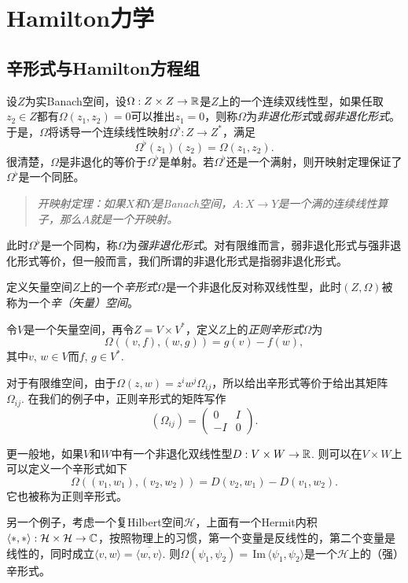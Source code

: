 \chapter{Hamilton力学}
\section{辛形式与Hamilton方程组}

\begin{para}
	设$Z$为实Banach空间，设$\Omega:Z\times Z\to \mathbb{R}$是$Z$上的一个连续双线性型，如果任取$z_2\in Z$都有$\Omega(z_1,z_2)=0$可以推出$z_1=0$，则称$\Omega$为\textit{非退化形式}或\textit{弱非退化形式}。于是，$\Omega$将诱导一个连续线性映射$\Omega^\flat:Z\to Z^*$，满足
	\[
		\Omega^\flat(z_1)(z_2)=\Omega(z_1,z_2).
	\]
	很清楚，$\Omega$是非退化的等价于$\Omega^\flat$是单射。若$\Omega^\flat$还是一个满射，则开映射定理保证了$\Omega^\flat$是一个同胚。
	\begin{quote}\it
	开映射定理：如果$X$和$Y$是Banach空间，$A : X \to Y$是一个满的连续线性算子，那么$A$就是一个开映射。
	\end{quote}
	此时$\Omega^\flat$是一个同构，称$\Omega$为\textit{强非退化形式}。对有限维而言，弱非退化形式与强非退化形式等价，但一般而言，我们所谓的非退化形式是指弱非退化形式。

	定义矢量空间$Z$上的一个\textit{辛形式}$\Omega$是一个非退化反对称双线性型，此时$(Z,\Omega)$被称为一个\textit{辛（矢量）空间}。
\end{para}

\begin{exa}
	令$V$是一个矢量空间，再令$Z=V\times V^*$，定义$Z$上的\textit{正则辛形式}$\Omega$为
	\[
	\Omega((v,f),(w,g))=g(v)-f(w),
	\]
	其中$v$, $w\in V$而$f$, $g\in V^*$.

	对于有限维空间，由于$\Omega(z,w)=z^iw^j\Omega_{ij}$，所以给出辛形式等价于给出其矩阵$\Omega_{ij}$. 在我们的例子中，正则辛形式的矩阵写作
	\[
	(\Omega_{ij})=
	\begin{pmatrix}
	0&I\\
	-I&0
	\end{pmatrix}.
	\]

	更一般地，如果$V$和$W$中有一个非退化双线性型$D:V\times W\to \mathbb{R}$. 则可以在$V\times W$上可以定义一个辛形式如下
	\[
	\Omega((v_1,w_1),(v_2,w_2))=D(v_2,w_1)-D(v_1,w_2).
	\]
	它也被称为正则辛形式。

	另一个例子，考虑一个复Hilbert空间$\mathcal{H}$，上面有一个Hermit内积$\langle *,*\rangle:\mathcal{H}\times \mathcal{H}\to \mathbb{C}$，按照物理上的习惯，第一个变量是反线性的，第二个变量是线性的，同时成立$\langle v,w\rangle=\overline{\langle w,v\rangle}$. 则$\Omega(\psi_1,\psi_2)=\,\mathrm{Im}\, \langle \psi_1,\psi_2\rangle$是一个$\mathcal{H}$上的（强）辛形式。
\end{exa}

